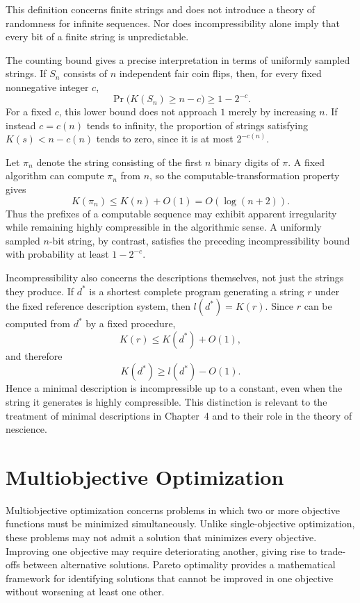 This definition concerns finite strings and does not introduce a theory of randomness for infinite sequences. Nor does incompressibility alone imply that every bit of a finite string is unpredictable.

The counting bound gives a precise interpretation in terms of uniformly sampled strings. If $S_n$ consists of $n$ independent fair coin flips, then, for every fixed nonnegative integer $c$,
\[
\Pr\bigl(K(S_n)\geq n-c\bigr)\geq 1-2^{-c}.
\]
For a fixed $c$, this lower bound does not approach $1$ merely by increasing $n$. If instead $c=c(n)$ tends to infinity, the proportion of strings satisfying $K(s)<n-c(n)$ tends to zero, since it is at most $2^{-c(n)}$.

\begin{example}
Let $\pi_n$ denote the string consisting of the first $n$ binary digits of $\pi$. A fixed algorithm can compute $\pi_n$ from $n$, so the computable-transformation property gives
\[
K(\pi_n)\leq K(n)+O(1)=O(\log(n+2)).
\]
Thus the prefixes of a computable sequence may exhibit apparent irregularity while remaining highly compressible in the algorithmic sense. A uniformly sampled $n$-bit string, by contrast, satisfies the preceding incompressibility bound with probability at least $1-2^{-c}$.
\end{example}

Incompressibility also concerns the descriptions themselves, not just the strings they produce. If $d^*$ is a shortest complete program generating a string $r$ under the fixed reference description system, then $l(d^*)=K(r)$. Since $r$ can be computed from $d^*$ by a fixed procedure,
\[
K(r)\leq K(d^*)+O(1),
\]
and therefore
\[
K(d^*)\geq l(d^*)-O(1).
\]
Hence a minimal description is incompressible up to a constant, even when the string it generates is highly compressible. This distinction is relevant to the treatment of minimal descriptions in Chapter~4 and to their role in the theory of nescience.

%
%

\section{Multiobjective Optimization}

Multiobjective optimization concerns problems in which two or more objective functions must be minimized simultaneously. Unlike single-objective optimization, these problems may not admit a solution that minimizes every objective. Improving one objective may require deteriorating another, giving rise to trade-offs between alternative solutions. Pareto optimality provides a mathematical framework for identifying solutions that cannot be improved in one objective without worsening at least one other.

